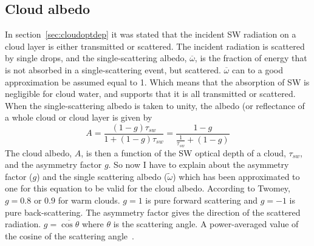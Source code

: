\subsection{Cloud albedo}
In section~\ref{sec:cloudoptdep} it was stated that the incident SW radiation on a cloud layer is either transmitted or scattered. The incident radiation is scattered by single drops, and the single-scattering albedo, $\overline{\omega}$, is the fraction of energy that is not absorbed in a single-scattering event, but scattered. $\overline{\omega}$ can to a good approximation be assumed equal to 1. Which means that the absorption of SW is negligible for cloud water, and supports that it is all transmitted or scattered. When the single-scattering albedo is taken to unity, the albedo (or reflectance of a whole cloud or cloud layer is given by~\citep{Hobbs1993}%
\begin{equation}
A = \frac{(1-g)\tau_{sw}}{1+(1-g)\tau_{sw}} = \frac{1-g}{\frac{1}{\tau_{sw}}+(1-g)}
\label{eqn:cloudalbedo_theory}
\end{equation}
The cloud albedo, $A$, is then a function of the SW optical depth of a cloud, $\tau_{sw}$, and the asymmetry factor $g$. 
So now I have to explain about the asymmetry factor ($g$) and the single scattering albedo ($\tilde{\omega}$) which has been approximated to one for this equation to be valid for the cloud albedo. According to Twomey, $g=0.8$ or $0.9$ for warm clouds. $g=1$ is pure forward scattering and $g=-1$ is pure back-scattering. The asymmetry factor gives the direction of the scattered radiation. $g=\overline{\cos \theta}$ where $\theta$ is the scattering angle. A power-averaged value of the cosine of the scattering angle~\citep{Twomey1974}.



